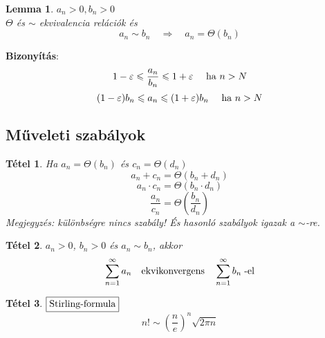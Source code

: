 \documentclass[a4paper,12pt,twoside]{book}
\newtheorem{tetel}{Tétel}[chapter]
\newtheorem{lemma}{Lemma}[chapter]
\theoremstyle{break}
\theoremstyle{plain}
\begin{document}
\begin{lemma} $a_n>0, b_n>0$\\
 $\Theta$ és $\sim$ ekvivalencia relációk és
\[a_n \sim b_n \quad \Rightarrow \quad a_n = \Theta(b_n)\]
\end{lemma}
\textbf{Bizonyítás}:
\[1-\varepsilon \leqslant \frac{a_n}{b_n} \leqslant 1+\varepsilon \quad \hbox{ ha } n>N\]
\[(1-\varepsilon)b_n \leqslant a_n \leqslant (1+\varepsilon)b_n \quad \hbox{ ha } n>N\]

\subsection{Műveleti szabályok}

\begin{tetel} Ha $a_n = \Theta(b_n)$ és $c_n = \Theta(d_n)$\\
  \[a_n+c_n = \Theta(b_n+d_n)\]
  \[a_n\cdot c_n = \Theta(b_n\cdot d_n)\]
  \[\frac{a_n}{c_n} = \Theta\left(\frac{b_n}{d_n}\right)\]
\emph{Megjegyzés}: különbségre nincs szabály! És hasonló szabályok igazak a $\sim$-re.
\end{tetel}
\addtocounter{biz}{1}

\begin{tetel} $a_n>0$, $b_n>0$ és $a_n \sim b_n$, akkor
  \[\sum^{\infty}_{n=1} a_n \quad \hbox{ekvikonvergens} \quad \sum^{\infty}_{n=1} b_n \;\hbox{-el}\]
\end{tetel}
\addtocounter{biz}{1}

\begin{tetel}$\boxed{$Stirling-formula$}$
  \[n! \sim \left(\frac{n}{e}\right)^n\sqrt{2\pi n}\]
\end{tetel}
\addtocounter{biz}{1}
\end{document}
